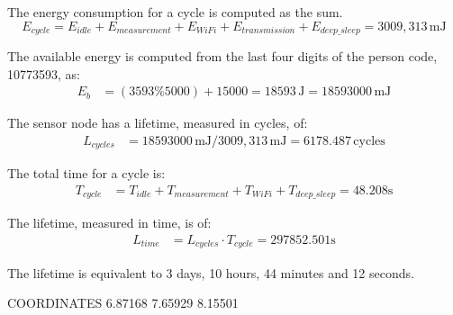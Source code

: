 The energy consumption for a cycle is computed as the sum.
\[
E_{cycle} = E_{idle} + E_{measurement} + E_{WiFi} + E_{transmission} + E_{deep\_sleep} = 3009,313\,\text{mJ} 
\]

The available energy is computed from the last four digits of the person code, 10773593, as: 
\begin{align*}
	E_{b} &= (3593 \% 5000) + 15000 = 18593\,\text{J} = 18593000\,\text{mJ}
\end{align*}

The sensor node has a lifetime, measured in cycles, of:
\begin{align*}
	L_{cycles}&= 18593000\,\text{mJ} / 3009,313\,\text{mJ} = 6178.487 \,\text{cycles} 
\end{align*}

The total time for a cycle is:
\begin{align*}
	T_{cycle} &= T_{idle} + T_{measurement} + T_{WiFi} + T_{deep\_sleep} = 48.208 \text{s}
\end{align*}

The lifetime, measured in time, is of:
\begin{align*}
	L_{time}&= L_{cycles} \cdot T_{cycle} = 297852.501 \text{s}
\end{align*}

The lifetime is equivalent to 3 days, 10 hours, 44 minutes and 12 seconds.


COORDINATES
6.87168 7.65929 8.15501


